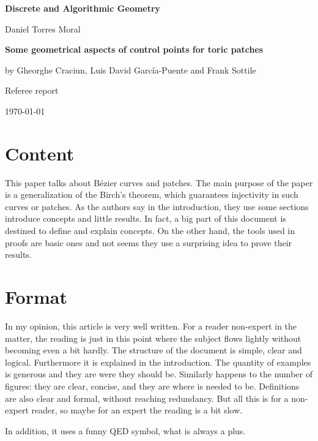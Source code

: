 \documentclass[11pt]{amsart}
\begin{document}
\begin{center}
\textbf{\sffamily
   Discrete and Algorithmic Geometry }

\medskip
  Daniel Torres Moral
\end{center}

\bigskip

\begin{center}
\large{
  \textbf{\sffamily Some geometrical aspects of control points for toric patches} 
  
  by Gheorghe Craciun, Luis David García-Puente and Frank Sottile}
  
\small{  Referee report}

\bigskip
\today

\end{center}

\bigskip

\section*{Content}

  This paper talks about Bézier curves and patches. The main purpose of the paper is a generalization of the Birch's theorem, which guarantees injectivity in such curves or patches. As the authors say in the introduction, they use some sections introduce concepts and little results. In fact, a big part of this document is destined to define and explain concepts. On the other hand, the tools used in proofs are basic ones and not seems they use a surprising idea to prove their results.

\section*{Format}

  In my opinion, this article is very well written. For a reader non-expert in the matter, the reading is just in this point where the subject flows lightly without becoming even a bit hardly. The structure of the document is simple, clear and logical. Furthermore it is explained in the introduction. The quantity of examples is generous and they are were they should be. Similarly happens to the number of figures: they are clear, concise, and they are where is needed to be. Definitions are also clear and formal, without reaching redundancy. But all this is for a non-expert reader, so maybe for an expert the reading is a bit slow.
  
  In addition, it uses a funny QED symbol, what is always a plus.
\end{document}
